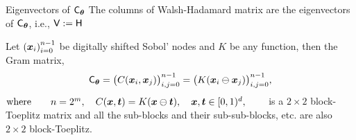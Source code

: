 \documentclass[handout, 10pt,compress,xcolor={usenames,dvipsnames}]{beamer} %
\newcommand{\bm}[1]{\boldsymbol{#1}}
\newcommand{\mCtheta}{\mC_{\vtheta}}
\renewcommand{\vtheta}{{\bm{\theta}}}
\begin{document}
\begin{frame}{Eigenvectors of $\mCtheta$}
	\vspace{-2ex}
	The columns of Walsh-Hadamard matrix are the eigenvectors of $\mCtheta$, i.e., $\mathsf{V} := \mathsf{H}$
	\begin{theorem}
		\label{thrm:block-toeplitz}
		Let $\left(\boldsymbol{x}_i\right)_{i=0}^{n-1}$ be digitally shifted Sobol' nodes and $K$ be any function,
		then the Gram matrix,
		\vspace{-1ex}
		$$
		\mCtheta = \bigl(C(\vx_i, \vx_j)\bigr)_{i,j=0}^{n-1} = \bigl(K(\vx_i \ominus \vx_j)\bigr)_{i,j=0}^{n-1},
		$$   
		$\text{where} \quad \quad n=2^m, \quad C(\boldsymbol{x}, \boldsymbol{t}) = K(\boldsymbol{x} \ominus \boldsymbol{t}), \quad  \boldsymbol{x}, \boldsymbol{t} \in [0,1)^d, \qquad
		$
		is a $2\times 2$ block-Toeplitz matrix and all the sub-blocks and their sub-sub-blocks, etc. are also $2\times 2$ block-Toeplitz. 
	\end{theorem}
	
	
\end{frame}
\end{document}
